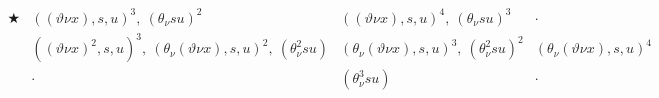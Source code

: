 
\[
\begin{array}{c|c|c|c}
\bigstar
& ((\vartheta \nu x),s,u)^3,\ (\theta_\nu su)^2
& ((\vartheta \nu x),s,u)^4,\ (\theta_\nu su)^3
& \cdot\\[0.45em]
& ((\vartheta \nu x)^2,s,u)^3,\ (\theta_\nu(\vartheta \nu x),s,u)^2,\ (\theta_\nu^2su)
& (\theta_\nu(\vartheta \nu x),s,u)^3,\ (\theta_\nu^2su)^2
& (\theta_\nu(\vartheta \nu x),s,u)^4\\[0.45em]
& \cdot
& (\theta_\nu^3su)
& \cdot
\end{array}
\]

